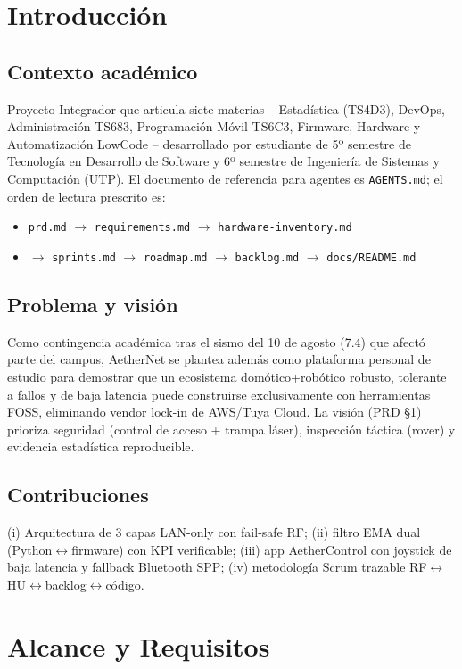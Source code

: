 \documentclass[conference]{IEEEtran}
\begin{document}
\section{Introducción}
\subsection{Contexto académico}
Proyecto Integrador que articula siete materias -- Estadística (TS4D3), DevOps, Administración TS683, Programación Móvil TS6C3, Firmware, Hardware y Automatización LowCode -- desarrollado por estudiante de 5º semestre de Tecnología en Desarrollo de Software y 6º semestre de Ingeniería de Sistemas y Computación (UTP). El documento de referencia para agentes es \texttt{AGENTS.md}; el orden de lectura prescrito es:
\begin{itemize}
\item \texttt{prd.md} $\rightarrow$ \texttt{requirements.md} $\rightarrow$ \texttt{hardware-inventory.md}
\item $\rightarrow$ \texttt{sprints.md} $\rightarrow$ \texttt{roadmap.md} $\rightarrow$ \texttt{backlog.md} $\rightarrow$ \texttt{docs/README.md}
\end{itemize}

\subsection{Problema y visión}
Como contingencia académica tras el sismo del 10 de agosto (7.4) que afectó parte del campus, AetherNet se plantea además como plataforma personal de estudio para demostrar que un ecosistema domótico+robótico robusto, tolerante a fallos y de baja latencia puede construirse exclusivamente con herramientas FOSS, eliminando vendor lock-in de AWS/Tuya Cloud. La visión (PRD \S1) prioriza seguridad (control de acceso + trampa láser), inspección táctica (rover) y evidencia estadística reproducible.

\subsection{Contribuciones}
(i) Arquitectura de 3 capas LAN-only con fail-safe RF; (ii) filtro EMA dual (Python$\leftrightarrow$firmware) con KPI verificable; (iii) app AetherControl con joystick de baja latencia y fallback Bluetooth SPP; (iv) metodología Scrum trazable RF$\leftrightarrow$HU$\leftrightarrow$backlog$\leftrightarrow$código.

\section{Alcance y Requisitos}
\end{document}
